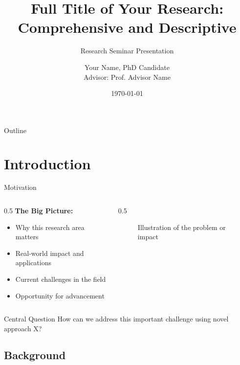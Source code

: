 \documentclass[aspectratio=169,11pt]{beamer}
\title[Short Title for Footer]{Full Title of Your Research:\\Comprehensive and Descriptive}
\subtitle{Research Seminar Presentation}
\author[Your Name]{Your Name, PhD Candidate\\
  Advisor: Prof. Advisor Name}
\institute[University]{
  Department of Your Field\\
  University Name\\
  \vspace{0.2cm}
  \texttt{yourname@university.edu}
}
\date{\today}
\begin{document}
\begin{frame}[plain]
  \titlepage
\end{frame}

\begin{frame}{Outline}
  \tableofcontents
\end{frame}


\section{Introduction}

\begin{frame}{Motivation}
  \begin{columns}[T]
    
    \begin{column}{0.5\textwidth}
      \textbf{The Big Picture:}
      \begin{itemize}
        \item Why this research area matters
        \item Real-world impact and applications
        \item Current challenges in the field
        \item Opportunity for advancement
      \end{itemize}
    \end{column}
    
    \begin{column}{0.5\textwidth}
      \begin{figure}
        \centering
        \caption{Illustration of the problem or impact}
      \end{figure}
    \end{column}
    
  \end{columns}
  
  \vspace{0.5cm}
  
  \begin{block}{Central Question}
    How can we address this important challenge using novel approach X?
  \end{block}
\end{frame}

\subsection{Background}
\end{document}
